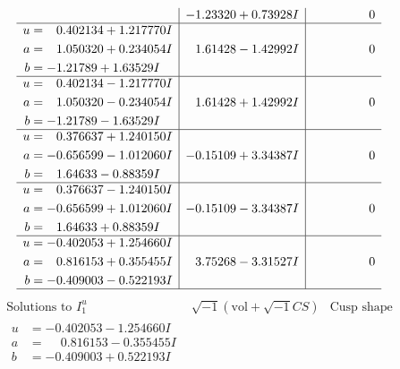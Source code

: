 \documentclass[1p]{elsarticle_modified}
\theoremstyle{definition}
\newcommand{\I}{\sqrt{-1}}
\begin{document}
$$\begin{array}{c|c|c}
 & -1.23320 + 0.73928 I & \phantom{-0.000000 } 0 \\ \hline\begin{aligned}
u &= \phantom{-}0.402134 + 1.217770 I \\
a &= \phantom{-}1.050320 + 0.234054 I \\
b &= -1.21789 + 1.63529 I\end{aligned}
 & \phantom{-}1.61428 - 1.42992 I & \phantom{-0.000000 } 0 \\ \hline\begin{aligned}
u &= \phantom{-}0.402134 - 1.217770 I \\
a &= \phantom{-}1.050320 - 0.234054 I \\
b &= -1.21789 - 1.63529 I\end{aligned}
 & \phantom{-}1.61428 + 1.42992 I & \phantom{-0.000000 } 0 \\ \hline\begin{aligned}
u &= \phantom{-}0.376637 + 1.240150 I \\
a &= -0.656599 - 1.012060 I \\
b &= \phantom{-}1.64633 - 0.88359 I\end{aligned}
 & -0.15109 + 3.34387 I & \phantom{-0.000000 } 0 \\ \hline\begin{aligned}
u &= \phantom{-}0.376637 - 1.240150 I \\
a &= -0.656599 + 1.012060 I \\
b &= \phantom{-}1.64633 + 0.88359 I\end{aligned}
 & -0.15109 - 3.34387 I & \phantom{-0.000000 } 0 \\ \hline\begin{aligned}
u &= -0.402053 + 1.254660 I \\
a &= \phantom{-}0.816153 + 0.355455 I \\
b &= -0.409003 - 0.522193 I\end{aligned}
 & \phantom{-}3.75268 - 3.31527 I & \phantom{-0.000000 } 0\\
 \hline 
 \end{array}$$\newpage$$\begin{array}{c|c|c}  
\text{Solutions to }I^u_{1}& \I (\text{vol} + \sqrt{-1}CS) & \text{Cusp shape}\\
 \hline 
\begin{aligned}
u &= -0.402053 - 1.254660 I \\
a &= \phantom{-}0.816153 - 0.355455 I \\
b &= -0.409003 + 0.522193 I\end{aligned}

\end{array}$$
\end{document}
